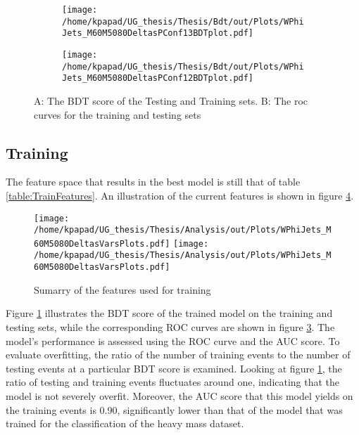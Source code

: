 \begin{figure}[h!]
\centering
\begin{subfigure}{0.49\textwidth}
\centering
\texttt{[image: /home/kpapad/UG\_thesis/Thesis/Bdt/out/Plots/WPhiJets\_M60M5080DeltasPConf13BDTplot.pdf]}
\caption{}
\label{subfig:LightBdtPlot}
\end{subfigure}
\begin{subfigure}{0.49\textwidth}
\centering
\texttt{[image: /home/kpapad/UG\_thesis/Thesis/Bdt/out/Plots/WPhiJets\_M60M5080DeltasPConf12BDTplot.pdf]}
\caption{}
\label{subfig:LightROCCurves}
\end{subfigure}
\caption{A: The BDT score of the Testing and Training sets. B: The roc curves for the training and testing sets}
\end{figure}

\newpage
\subsection{Training}
\label{sec:org02d5e1e}
\label{sec:LightTraining}
The feature space that results in the best model is still that of table \ref{table:TrainFeatures}. An illustration of the current features is shown in figure \ref{fig:LightFeatures}.
\begin{figure}[h!]
\centering
\texttt{[image: /home/kpapad/UG\_thesis/Thesis/Analysis/out/Plots/WPhiJets\_M60M5080DeltasVarsPlots.pdf]}
\texttt{[image: /home/kpapad/UG\_thesis/Thesis/Analysis/out/Plots/WPhiJets\_M60M5080DeltasVarsPlots.pdf]}
\caption{Sumarry of the features used for training }
\label{fig:LightFeatures}
\end{figure}

Figure \ref{subfig:LightBdtPlot} illustrates the BDT score of the trained model on the training and testing sets, while the corresponding ROC curves are shown in figure \ref{subfig:LightROCCurves}. The model's performance is assessed using the ROC curve and the AUC score. To evaluate overfitting, the ratio of the number of training events to the number of testing events at a particular BDT score is examined. Looking at figure \ref{subfig:LightBdtPlot}, the ratio of testing and training events fluctuates around one, indicating that the model is not severely overfit. Moreover, the AUC score that this model yields on the training events is 0.90, significantly lower than that of the model that was trained for the classification of the heavy mass dataset.

